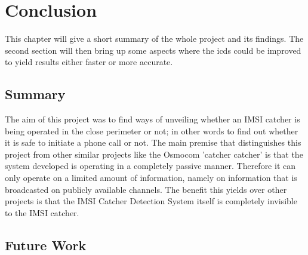 \chapter{Conclusion}

This chapter will give a short summary of the whole project and its findings.
The second section will then bring up some aspects where the \gls{icds} could be improved to yield results either faster or more accurate.

\section{Summary}

The aim of this project was to find ways of unveiling whether an IMSI catcher is being operated in the close perimeter or not; in other words to find out whether it is safe to initiate a phone call or not.
The main premise that distinguishes this project from other similar projects like the Osmocom 'catcher catcher' is that the system developed is operating in a completely passive manner.
Therefore it can only operate on a limited amount of information, namely on information that is broadcasted on publicly available channels.
The benefit this yields over other projects is that the IMSI Catcher Detection System itself is completely invisible to the IMSI catcher.



\section{Future Work}

